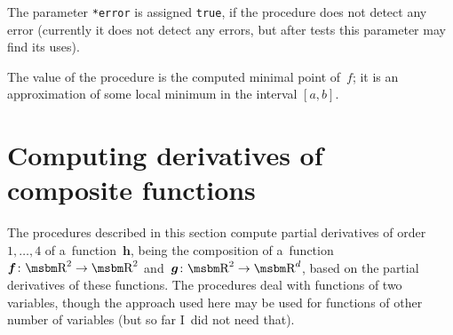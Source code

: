 The parameter \texttt{*error} is assigned \texttt{true}, if the procedure
does not detect any error (currently it does not detect any errors,
but after tests this parameter may find its uses).

The value of the procedure is the computed minimal point of~$f$;
it is an approximation of some local minimum in the interval $[a,b]$.


\newpage
\section{Computing derivatives of composite functions}

The procedures described in this section compute partial derivatives
of order  $1,\ldots,4$ of a~function~$\bm{h}$, being the composition
of a~function $\bm{f}\colon\R^2\rightarrow\R^2$
and~$\bm{g}\colon\R^2\rightarrow\R^d$, based on the partial derivatives
of these functions. The procedures deal with functions of two variables,
though the approach used here may be used for functions of other number of
variables (but so far I~did not need that).


